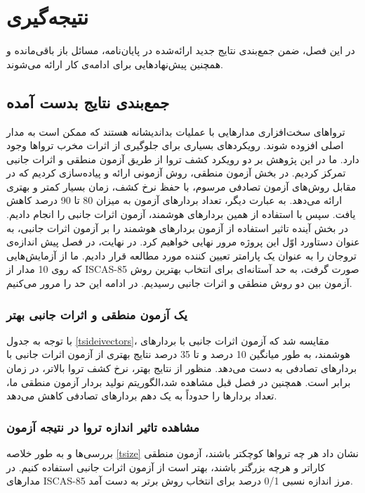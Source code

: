 
\chapter{نتیجه‌گیری}

در این فصل، ضمن جمع‌بندی نتایج جدید ارائه‌شده در پایان‌نامه، 
مسائل باز باقی‌مانده و همچنین پیش‌نهادهایی برای ادامه‌ی کار ارائه می‌شوند.

\section{جمع‌بندی نتایج بدست آمده}
تروا‌های سخت‌افزاری مدارهایی با عملیات بداندیشانه هستند که ممکن است به مدار اصلی افزوده شوند. رویکردهای بسیاری برای جلوگیری از اثرات مخرب ترواها وجود دارد. ما در این پژوهش بر دو رویکرد کشف تروا از طریق آزمون منطقی و اثرات جانبی تمرکز کردیم. در بخش آزمون منطقی، روش آزمونی ارائه و پیاده‌سازی کردیم که در مقابل روش‌های آزمون تصادفی مرسوم، با حفظ نرخ کشف، زمان بسیار کمتر و بهتری ارائه می‌دهد. به عبارت دیگر، تعداد بردارهای آزمون به میزان 80 تا 90 درصد کاهش یافت. سپس با استفاده از همین بردارهای هوشمند، آزمون اثرات جانبی را انجام دادیم. در بخش آینده تاثیر استفاده از آزمون بردارهای هوشمند را بر آزمون اثرات جانبی، به عنوان دستاورد اوّل این پروژه مرور نهایی خواهیم کرد. در نهایت، در فصل پیش اندازه‌ی تروجان را به عنوان یک پارامتر تعیین کننده مورد مطالعه قرار دادیم. ما از آزمایش‌هایی که روی 10 مدار از ISCAS-85 صورت گرفت، به حد آستانه‌ای برای انتخاب بهترین روش آزمون بین دو روش منطقی و اثرات جانبی رسیدیم. در ادامه این حد را مرور می‌کنیم.
\subsection{یک آزمون منطقی و اثرات جانبی بهتر}
با توجه به جدول \ref{tsideivectors}، مقایسه شد که آزمون اثرات جانبی با بردارهای هوشمند، به طور میانگین 10 درصد و تا 35 درصد نتایج بهتری از آزمون اثرات جانبی با بردارهای تصادفی به دست می‌دهد. منظور از نتایج بهتر، نرخ کشف تروا بالاتر، در زمان برابر است. همچنین  در فصل قبل مشاهده شد،الگوریتم نولید بردار آزمون منطقی ما، تعداد بردارها را حدوداً به یک دهم بردارهای تصادفی کاهش می‌دهد.
\subsection{مشاهده تاثیر اندازه تروا در نتیجه آزمون}
بررسی‌ها و به طور خلاصه \ref{tsize} نشان داد هر چه تروا‌ها کوچکتر باشند، آزمون منطقی کارا‌تر و هرچه بزرگتر باشند، بهتر است از آزمون اثرات جانبی استفاده کنیم. در مدارهای ISCAS-85 مرز اندازه نسبی 0/1 درصد برای انتخاب روش برتر به دست آمد.

